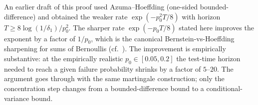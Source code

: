 \begin{remark}\label{rem:anchor_count_lb_remark}
An earlier draft of this proof used Azuma--Hoeffding (one-sided
bounded-difference) and obtained the weaker rate
$\exp(-p_0^2 T / 8)$ with horizon $T \ge 8 \log(1/\delta_1)/p_0^2$. The
sharper rate $\exp(-p_0 T / 8)$ stated here improves the exponent by a
factor of $1/p_0$, which is the canonical Bernstein-vs-Hoeffding sharpening
for sums of Bernoullis (cf.\ \cite[Theorem 2.3]{vershynin2018}). The
improvement is empirically substantive: at the empirically realistic
$p_0 \in [0.05, 0.2]$ the test-time horizon needed to reach a given
failure probability shrinks by a factor of $5$--$20$. The argument
goes through with the same martingale construction; only the
concentration step changes from a bounded-difference bound to a
conditional-variance bound.
\end{remark}
